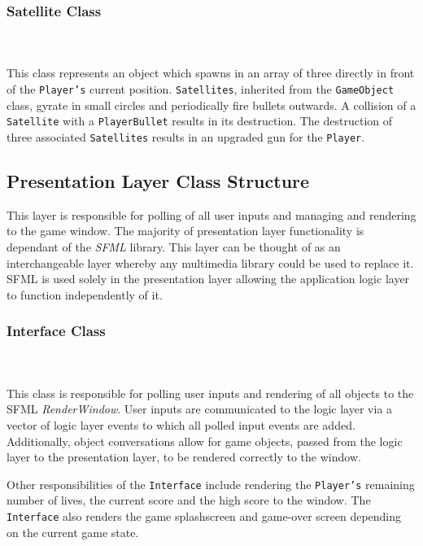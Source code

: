 \documentclass[10pt,twocolumn]{witseiepaper}
\begin{document}
\subsubsection{Satellite Class}
~\\
~\\
This class represents an object which spawns in an array of three directly in front of the \texttt{Player's} current position. \texttt{Satellites}, inherited from the \texttt{GameObject} class, gyrate in small circles and periodically fire bullets outwards.
A collision of a \texttt{Satellite} with a \texttt{PlayerBullet} results in its destruction.
The destruction of three associated \texttt{Satellites} results in an upgraded gun for the \texttt{Player}.

\subsection{Presentation Layer Class Structure}

This layer is responsible for polling of all user inputs and managing and rendering to the game window. The majority of presentation layer functionality is dependant of the \textit{SFML} library. This layer can be thought of as an interchangeable layer whereby any multimedia library could be used to replace it. SFML is used solely in the presentation layer allowing the application logic layer to function independently of it.

\subsubsection{Interface Class}
~\\
~\\
This class is responsible for polling user inputs and rendering of all objects to the SFML \textit{RenderWindow}. User inputs are communicated to the logic layer via a vector of logic layer events to which all polled input events are added. Additionally, object conversations allow for game objects, passed from the logic layer to the presentation layer, to be rendered correctly to the window. 

Other responsibilities of the \texttt{Interface} include rendering the \texttt{Player's} remaining number of lives, the current score and the high score to the window. The \texttt{Interface} also renders the game splashscreen and game-over screen depending on the current game state.

\end{document}
